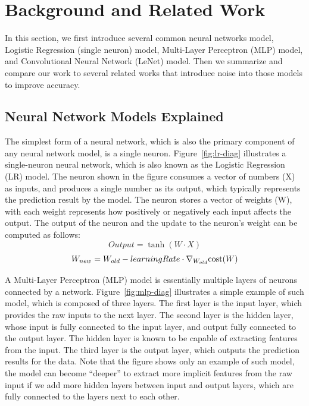 \section{Background and Related Work}
\label{sec:problem}

In this section, we first introduce several common neural networks model,
Logistic Regression (single neuron) model, Multi-Layer Perceptron (MLP) model,
and Convolutional Neural Network (LeNet) model. Then we summarize and compare
our work to several related works that introduce noise into those models to
improve accuracy.

\subsection{Neural Network Models Explained}

The simplest form of a neural network, which is also the primary component of
any neural network model, is a single neuron. Figure~\ref{fig:lr-diag} illustrates a
single-neuron neural network, which is also known as the Logistic Regression
(LR) model. The neuron shown in the figure consumes a vector of numbers (X) as
inputs, and produces a single number as its output, which typically represents
the prediction result by the model. The neuron stores a vector of weights (W),
with each weight represents how positively or negatively each input affects the
output. The output of the neuron and the update to the neuron's weight can be
computed as follows:
\[
  Output = \tanh(W \cdot X)
\]
\[
  W_{new} = W_{old} - learningRate \cdot \nabla_{W_{old}} \text{cost}(W)
\]

A Multi-Layer Perceptron (MLP) model is essentially multiple layers of neurons
connected by a network. Figure~\ref{fig:mlp-diag} illustrates a simple example of
such model, which is composed of three layers. The first layer is the input
layer, which provides the raw inputs to the next layer. The second layer is the
hidden layer, whose input is fully connected to the input layer, and output
fully connected to the output layer. The hidden layer is known to be capable of
extracting features from the input. The third layer is the output layer, which
outputs the prediction results for the data. Note that the figure shows only an
example of such model, the model can become ``deeper'' to extract more implicit
features from the raw input if we add more hidden layers between input and
output layers, which are fully connected to the layers next to each other.

